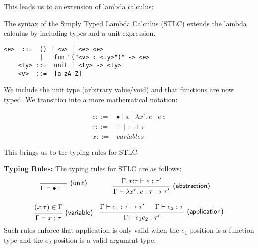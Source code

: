\noindent 
This leads us to an extension of lambda calculus:
\begin{Def}

    The syntax of the Simply Typed Lambda Calculus (STLC) extends the lambda calculus by including types and a unit expression.
    
    \begin{lstlisting}[numbers=none, mathescape=true]
    <e>  ::=  () | <v> | <e> <e> 
          |   fun "("<v> : <ty>")" -> <e>
    <ty> ::=  unit | <ty> -> <ty>
    <v>  ::=  [a-zA-Z]
    \end{lstlisting}
    
    \noindent
    We include the unit type (arbitrary value/void) and that functions are now typed. We transition into 
    a more mathematical notation:

\[
\begin{array}{ll}
e ::= & \bullet \mid x \mid \lambda x^{\tau}.\, e \mid e\,e \\
\tau ::= & \top \mid \tau \rightarrow \tau \\
x ::= & \textit{variables}
\end{array}
\]

\end{Def}
    


\newpage 
\noindent
This brings us to the typing rules for STLC:

\begin{Def}

    \textbf{Typing Rules:} The typing rules for STLC are as follows:
    \[
\begin{array}{cc}
\begin{prooftree}
  \hypo{}
  \infer1[\textsf{(unit)}]{\Gamma \vdash \bullet : \top}
\end{prooftree}
&
\begin{prooftree}
  \hypo{\Gamma, x{:}\tau \vdash e : \tau'}
  \infer1[\textsf{(abstraction)}]{\Gamma \vdash \lambda x^{\tau} .\, e : \tau \rightarrow \tau'}
\end{prooftree}
\\[2em]
\begin{prooftree}
  \hypo{(x{:}\tau) \in \Gamma}
  \infer1[\textsf{(variable)}]{\Gamma \vdash x : \tau}
\end{prooftree}
&
\begin{prooftree}
  \hypo{\Gamma \vdash e_1 : \tau \rightarrow \tau'}
  \hypo{\Gamma \vdash e_2 : \tau}
  \infer2[\textsf{(application)}]{\Gamma \vdash e_1 e_2 : \tau'}
\end{prooftree}
\end{array}
\]
\noindent
Such rules enforce that application is only valid when the $e_1$ position is a function type and the $e_2$ position is a valid argument type.
\end{Def}

